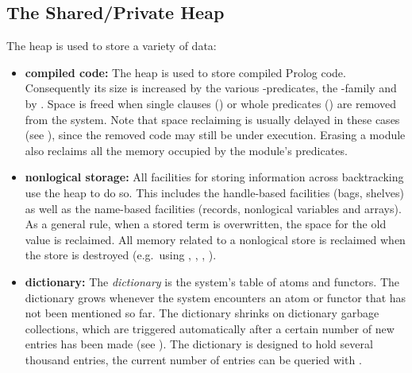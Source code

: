 \subsection{The Shared/Private Heap}
The heap is used to store a variety of data:
\begin{itemize}
\item {\bf compiled code:}
The heap is used to store compiled Prolog code.
Consequently its size is increased by the various -predicates,
the -family and by .
Space is freed when single clauses () or
whole predicates () are removed from the system.
Note that space reclaiming is usually delayed in these cases
(see ),
since the removed code may still be under execution. 
Erasing a module also reclaims all the memory occupied by the module's
predicates.
\item {\bf nonlogical storage:}
All facilities for storing information across backtracking use the
heap to do so. This includes the handle-based facilities
(bags, shelves) as well as the name-based facilities (records, nonlogical
variables and arrays).
As a general rule, when a stored term is overwritten, the space for
the old value is reclaimed. All memory related to a nonlogical store is
reclaimed when the store is destroyed (e.g.\ using
,
,
,
).
\item {\bf dictionary:}
The {\it dictionary} is the system's table of atoms and functors.
The dictionary grows whenever the system encounters an atom or functor that
has not been mentioned so far.
The dictionary shrinks on dictionary garbage collections, which are triggered
automatically after a certain number of new entries has been made
(see ).
The dictionary is designed to hold several thousand entries,
the current number of entries can be queried with .

\end{itemize}
